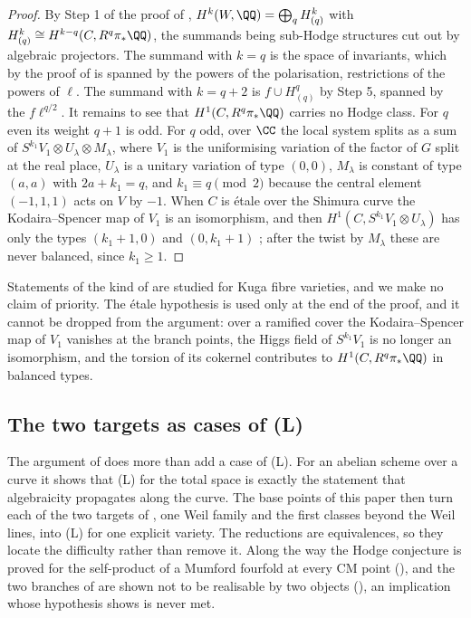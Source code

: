 \begin{proof}
By Step 1 of the proof of ,
$H^{k}(W,\QQ)=\bigoplus_{q}H^{k}_{(q)}$ with $H^{k}_{(q)}\cong
H^{k-q}(C,R^{q}\pi_{*}\QQ)$, the summands being sub-Hodge structures cut out by
algebraic projectors. The summand with $k=q$ is the space of invariants, which
by the proof of  is spanned by the powers of the
polarisation, restrictions of the powers of $\ell$. The summand with $k=q+2$
is $f\cup H^{q}_{(q)}$ by Step 5, spanned by the $f\ell^{q/2}$. It remains to
see that $H^{1}(C,R^{q}\pi_{*}\QQ)$ carries no Hodge class. For $q$ even its
weight $q+1$ is odd. For $q$ odd, over $\CC$ the local system splits as a sum
of $S^{k_{1}}V_{1}\otimes U_{\lambda}\otimes M_{\lambda}$, where $V_{1}$ is the
uniformising variation of the factor of $G$ split at the real place, $U_{\lambda}$ is
a unitary variation of type $(0,0)$, $M_{\lambda}$ is constant of type $(a,a)$
with $2a+k_{1}=q$, and $k_{1}\equiv q\pmod2$ because the central element
$(-1,1,1)$ acts on $V$ by $-1$. When $C$ is \'etale over the Shimura curve the
Kodaira--Spencer map of $V_{1}$ is an isomorphism, and then
$H^{1}(C,S^{k_{1}}V_{1}\otimes U_{\lambda})$ has only the types $(k_{1}+1,0)$
and $(0,k_{1}+1)$ \cite{Zuc79}; after the twist by $M_{\lambda}$ these are
never balanced, since $k_{1}\ge1$.
\end{proof}

Statements of the kind of  are studied for Kuga
fibre varieties, and we make no claim of priority.
The \'etale hypothesis is used only at the end of the proof, and it cannot be
dropped from the argument: over a ramified cover the Kodaira--Spencer map of
$V_{1}$ vanishes at the branch points, the Higgs field of $S^{k_{1}}V_{1}$ is
no longer an isomorphism, and the torsion of its cokernel contributes to
$H^{1}(C,R^{q}\pi_{*}\QQ)$ in balanced types.

\subsection{The two targets as cases of (L)}
\label{ssec:targets}

The argument of  does more than add a case of
\textup{(L)}. For an abelian scheme over a curve it shows that \textup{(L)}
for the total space is exactly the statement that algebraicity propagates
along the curve. The base points of this paper then turn each of the two
targets of , one Weil family and the first
classes beyond the Weil lines, into \textup{(L)} for one explicit variety. The
reductions are equivalences, so they locate the difficulty rather than remove
it. Along the way the Hodge conjecture is proved for the self-product of a
Mumford fourfold at every CM point (), and the two
branches of  are shown not to be realisable by two
objects (), an implication whose hypothesis
 shows is never met.

